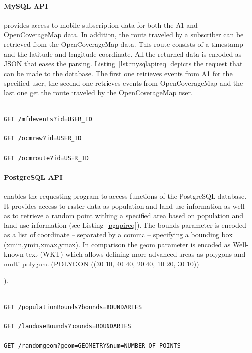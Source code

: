 \documentclass[master,english]{hgbthesis}
\begin{document}
\paragraph{MySQL API}

provides access to mobile subscription data for both the A1 and OpenCoverageMap data. In addition, the route traveled by a subscriber can be retrieved from the OpenCoverageMap data. This route consists of a timestamp and the latitude and longitude coordinate. All the returned data is encoded as JSON that eases the parsing. Listing~\ref{lst:mysqlapireq} depicts the request that can be made to the database. The first one retrieves events from A1 for the specified user, the second one retrieves events from OpenCoverageMap and the last one get the route traveled by the OpenCoverageMap user.

\begin{lstlisting}[style=BashInputStyle,caption={MySQL API requests},label={lst:mysqlapireq}]

GET /mfdevents?id=USER_ID

GET /ocmraw?id=USER_ID

GET /ocmroute?id=USER_ID

\end{lstlisting}

\paragraph{PostgreSQL API} 

enables the requesting program to access functions of the PostgreSQL database. It provides access to raster data as population and land use information as well as to retrieve a random point withing a specified area based on population and land use information (see Listing~\ref{pgapireq}). The bounds parameter is encoded as a list  of coordinate -- separated by a comma -- specifying a bounding box (xmin,ymin,xmax,ymax). In comparison the geom parameter is encoded as Well-known text (WKT) which allows defining more advanced areas as polygons and multi polygons (POLYGON ((30 10, 40 40, 20 40, 10 20, 30 10))

). 

\begin{lstlisting}[style=BashInputStyle,caption={PostgreSQL API requests},label={lst:pgapireq}]

GET /populationBounds?bounds=BOUNDARIES

GET /landuseBounds?bounds=BOUNDARIES

GET /randomgeom?geom=GEOMETRY&num=NUMBER_OF_POINTS

\end{lstlisting}
\end{document}
